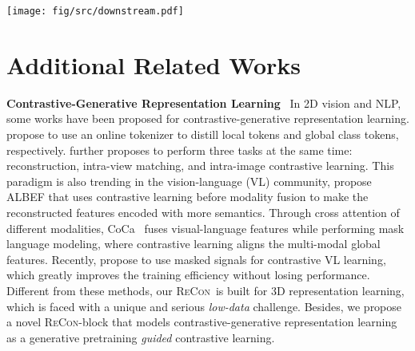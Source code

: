 \documentclass{article}
\theoremstyle{plain}
\theoremstyle{definition}
\theoremstyle{remark}
\def\recon{{\scshape ReCon}}
\begin{document}
\newpage
\appendix
\onecolumn
\begin{figure*}[ht]
    \begin{center}
    \texttt{[image: fig/src/downstream.pdf]}
    \caption{\textbf{Pipeline of \recon\ executing zero-shot and fine-tuning}. We fuse the pretrained global image (\texttt{[IMG]}) and text (\texttt{[TXT]}) query features by summation for zero-shot prediction. During fine-tuning, a new \texttt{[CLS]} token is added and fused with pretrained global \texttt{[IMG]} and \texttt{[TXT]} queries by concatenation for fine-tuning prediction. No stop-grad is used in CA connections during fine-tuning.}\label{fig:zeroshot}
    \end{center}
    \vspace{-10pt}
\end{figure*} \section{Additional Related Works}
\textbf{Contrastive-Generative Representation Learning}~
In 2D vision and NLP, some works have been proposed for contrastive-generative representation learning. \citet{iBoT} propose to use an online tokenizer to distill local tokens and global class tokens, respectively. 
\citet{sim22} further proposes to perform three tasks at the same time: reconstruction, intra-view matching, and intra-image contrastive learning. 
This paradigm is also trending in the vision-language (VL) community, \citet{albef21} propose ALBEF that uses contrastive learning before modality fusion to make the reconstructed features encoded with more semantics. Through cross attention of different modalities, CoCa~\citep{CoCa22} fuses visual-language features while performing mask language modeling, where contrastive learning aligns the multi-modal global features. Recently, \citet{FLIP22} propose to use masked signals for contrastive VL learning, which greatly improves the training efficiency without losing performance. 
Different from these methods, our \recon\ is built for 3D representation learning, which is faced with a unique and serious \textit{low-data} challenge. 
Besides, we propose a novel \recon-block that models contrastive-generative representation learning as a generative pretraining \textit{guided} contrastive learning.
\end{document}
